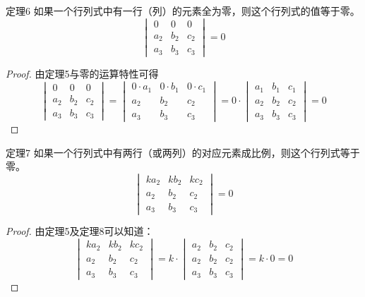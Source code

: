 \begin{blk}{定理6}
    如果一个行列式中有一行（列）的元素全为零，则这个行列式的值等于零。
    \[\begin{vmatrix}
        0&0&0\\a_2&b_2&c_2\\a_3&b_3&c_3
    \end{vmatrix}=0\]
\end{blk}

\begin{proof}
    由定理5与零的运算特性可得
\[\begin{vmatrix}
    0&0&0\\a_2&b_2&c_2\\a_3&b_3&c_3
\end{vmatrix}=\begin{vmatrix}
    0\cdot a_1&0\cdot b_1&0\cdot c_1\\a_2&b_2&c_2\\a_3&b_3&c_3
\end{vmatrix}=0\cdot\begin{vmatrix}
    a_1&b_1&c_1\\a_2&b_2&c_2\\a_3&b_3&c_3
\end{vmatrix}=0\]
\end{proof}

\begin{blk}{定理7}
    如果一个行列式中有两行（或两列）的对应元素成比例，则这个行列式等于零。
\[\begin{vmatrix}
    ka_2&kb_2&kc_2\\a_2&b_2&c_2\\a_3&b_3&c_3
\end{vmatrix}=0\]
\end{blk}

\begin{proof}
    由定理5及定理8可以知道：
    \[\begin{vmatrix}
        ka_2&kb_2&kc_2\\a_2&b_2&c_2\\a_3&b_3&c_3
    \end{vmatrix}=k\cdot\begin{vmatrix}
        a_2&b_2&c_2\\a_2&b_2&c_2\\a_3&b_3&c_3
    \end{vmatrix}=k\cdot 0=0\]
\end{proof}

